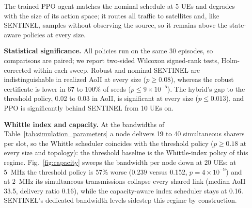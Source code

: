 The trained PPO agent matches the nominal schedule at 5 UEs and degrades with the size of its action space; it
routes all traffic to satellites and, like SENTINEL, samples without observing the source, so it remains above the
state-aware policies at every size.

\textbf{Statistical significance.} All policies run on the same 30 episodes, so comparisons are paired; we report
two-sided Wilcoxon signed-rank tests, Holm-corrected within each sweep. Robust and nominal SENTINEL are
indistinguishable in realized AoII at every size ($p\ge0.08$), whereas the robust certificate is lower in 67 to
100\% of seeds ($p\le 9\times10^{-5}$). The hybrid's gap to the threshold policy, 0.02 to 0.03 in AoII, is
significant at every size ($p\le0.013$), and PPO is significantly behind SENTINEL from 10 UEs on.

\textbf{Whittle index and capacity.} At the bandwidths of Table~\ref{tab:simulation_parameters} a node delivers 19 to 40
simultaneous sharers per slot, so the Whittle scheduler coincides with the threshold policy ($p\ge0.18$ at every
size and topology): the threshold baseline is the Whittle-index policy of this regime. Fig.~\ref{fig:capacity}
sweeps the bandwidth per node down at 20 UEs: at 5~MHz the threshold policy is 57\% worse (0.239 versus 0.152,
$p=4\times10^{-9}$) and at 2~MHz its simultaneous transmissions collapse every shared link (median AoII 33.5,
delivery ratio 0.16), while the capacity-aware index scheduler stays at 0.16. SENTINEL's dedicated bandwidth levels
sidestep this regime by construction.

